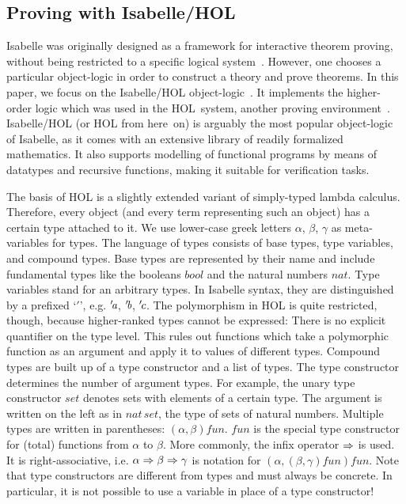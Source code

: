 \subsection{Proving with Isabelle/HOL}\label{subsec:isabelle}

Isabelle was originally designed as a framework for interactive theorem
proving, without being restricted to a specific logical system~\cite{paulson90}.
However, one chooses a particular object-logic in order to construct a theory
and prove theorems.
In this paper, we focus on the Isabelle/HOL object-logic~\cite{npw02}.
It implements the higher-order logic which was used in the HOL~system,
another proving environment~\cite{gordon93}.
Isabelle/HOL (or HOL from here~on) is arguably the most popular object-logic
of Isabelle, as it comes with an extensive library of readily formalized
mathematics.
It also supports modelling of functional programs by means of datatypes and
recursive functions, making it suitable for verification tasks. %

The basis of HOL is a slightly extended variant of simply-typed lambda calculus.
Therefore, every object (and every term representing such an object) has a
certain type attached to it.
We use lower-case greek letters $\alpha$, $\beta$, $\gamma$ as meta-variables
for types.
The language of types consists of base types, type variables, and compound
types.
Base types are represented by their name and include fundamental types like
the booleans $\mathit{bool}$ and the natural numbers $\mathit{nat}$.
Type variables stand for an arbitrary types.
In Isabelle syntax, they are distinguished by a prefixed `$'$', e.g.
${'\!\textit{a}}$, ${'\!\textit{b}}$, ${'\!\textit{c}}$.
The polymorphism in HOL is quite restricted, though, because higher-ranked
types cannot be expressed:
There is no explicit quantifier on the type level.
This rules out functions which take a polymorphic function as an argument and
apply it to values of different types.
Compound types are built up of a type constructor and a list of types.
The type constructor determines the number of argument types.
For example, the unary type constructor $\mathit{set}$ denotes sets with
elements of a certain type.
The argument is written on the left as in $\mathit{nat\,set}$, the type of
sets of natural numbers.
Multiple types are written in parentheses: $(\alpha, \beta) \mathit{fun}$.
$\mathit{fun}$ is the special type constructor for (total) functions from
$\alpha$ to $\beta$.
More commonly, the infix operator $\Rightarrow$ is used.
It is right-associative, i.e. $\alpha \Rightarrow \beta \Rightarrow \gamma$ is notation for
$(\alpha, (\beta, \gamma) \mathit{fun}) \mathit{fun}$.
Note that type constructors are different from types and must always be
concrete.
In particular, it is not possible to use a variable in place of a type
constructor!

